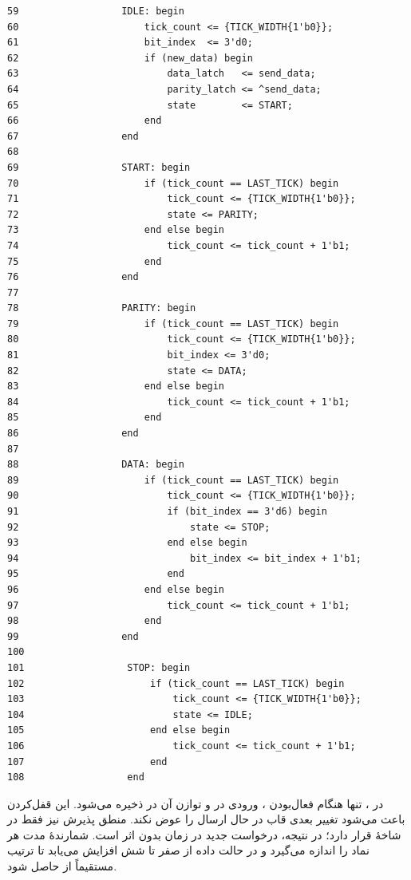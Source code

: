 \begin{dsdlcodeblock}
\begin{verbatim}
59                  IDLE: begin
60                      tick_count <= {TICK_WIDTH{1'b0}};
61                      bit_index  <= 3'd0;
62                      if (new_data) begin
63                          data_latch   <= send_data;
64                          parity_latch <= ^send_data;
65                          state        <= START;
66                      end
67                  end
68
69                  START: begin
70                      if (tick_count == LAST_TICK) begin
71                          tick_count <= {TICK_WIDTH{1'b0}};
72                          state <= PARITY;
73                      end else begin
74                          tick_count <= tick_count + 1'b1;
75                      end
76                  end
77
78                  PARITY: begin
79                      if (tick_count == LAST_TICK) begin
80                          tick_count <= {TICK_WIDTH{1'b0}};
81                          bit_index <= 3'd0;
82                          state <= DATA;
83                      end else begin
84                          tick_count <= tick_count + 1'b1;
85                      end
86                  end
87
88                  DATA: begin
89                      if (tick_count == LAST_TICK) begin
90                          tick_count <= {TICK_WIDTH{1'b0}};
91                          if (bit_index == 3'd6) begin
92                              state <= STOP;
93                          end else begin
94                              bit_index <= bit_index + 1'b1;
95                          end
96                      end else begin
97                          tick_count <= tick_count + 1'b1;
98                      end
99                  end
100
101                  STOP: begin
102                      if (tick_count == LAST_TICK) begin
103                          tick_count <= {TICK_WIDTH{1'b0}};
104                          state <= IDLE;
105                      end else begin
106                          tick_count <= tick_count + 1'b1;
107                      end
108                  end
\end{verbatim}
\end{dsdlcodeblock}

در ، تنها هنگام فعال‌بودن ، ورودی در  و
توازن آن در  ذخیره می‌شود. این قفل‌کردن باعث می‌شود تغییر بعدی
 قاب در حال ارسال را عوض نکند. منطق پذیرش نیز فقط در شاخهٔ 
قرار دارد؛ در نتیجه، درخواست جدید در زمان  بدون اثر است. شمارندهٔ
 مدت هر نماد را اندازه می‌گیرد و  در حالت داده از صفر تا
شش افزایش می‌یابد تا ترتیب  مستقیماً از
 حاصل شود.


